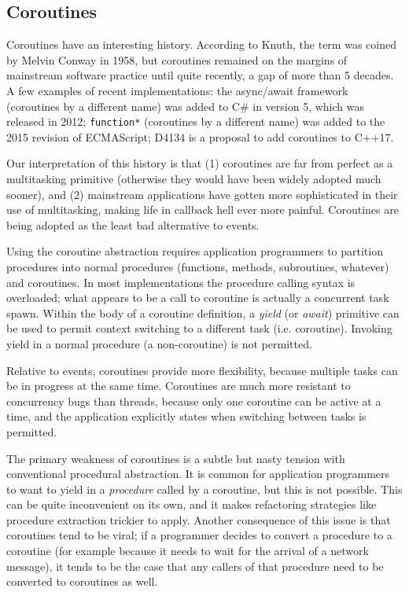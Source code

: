 \documentclass[10pt,preprint]{sigplanconf}
\begin{document}
\subsection{Coroutines}

Coroutines have an interesting history.
According to Knuth, the term was coined by Melvin Conway in 1958, but coroutines remained on the margins of mainstream software practice until quite recently, a gap of more than 5 decades.
A few examples of recent implementations: the async/await framework (coroutines by a different name) was added to C\# in version 5, which was released in 2012; \texttt{function*} (coroutines by a different name) was added to the 2015 revision of ECMAScript; D4134 is a proposal to add coroutines to C++17.

Our interpretation of this history is that (1) coroutines are far from perfect as a multitasking primitive (otherwise they would have been widely adopted much sooner), and (2) mainstream applications have gotten more sophisticated in their use of multitasking, making life in callback hell ever more painful.
Coroutines are being adopted as the least bad alternative to events.

Using the coroutine abstraction requires application programmers to partition procedures into normal procedures (functions, methods, subroutines, whatever) and coroutines.
In most implementations the procedure calling syntax is overloaded; what appears to be a call to coroutine is actually a concurrent task spawn.
Within the body of a coroutine definition, a \emph{yield} (or \emph{await}) primitive can be used to permit context switching to a different task (i.e. coroutine).
Invoking yield in a normal procedure (a non-coroutine) is not permitted.

Relative to events, coroutines provide more flexibility, because multiple tasks can be in progress at the same time.
Coroutines are much more resistant to concurrency bugs than threads, because only one coroutine can be active at a time, and the application explicitly states when switching between tasks is permitted.

The primary weakness of coroutines is a subtle but nasty tension with conventional procedural abstraction.
It is common for application programmers to want to yield in a \emph{procedure} called by a coroutine, but this is not possible.
This can be quite inconvenient on its own, and it makes refactoring strategies like procedure extraction trickier to apply.
Another consequence of this issue is that coroutines tend to be viral; if a programmer decides to convert a procedure to a coroutine (for example because it needs to wait for the arrival of a network message), it tends to be the case that any callers of that procedure need to be converted to coroutines as well.
\end{document}
